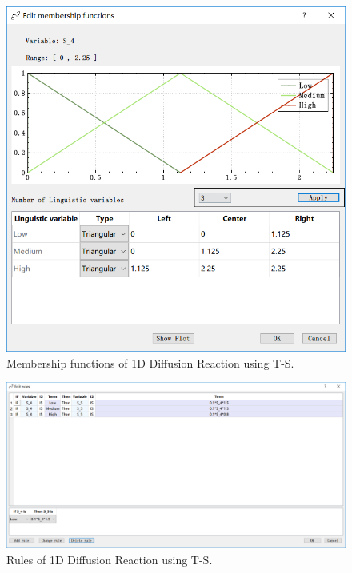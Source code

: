 \documentclass[journal,a4paper,onecolumn]{article}
\begin{document}
\begin{figure}[!hbt]
	\begin{center}
		\includegraphics[width=\columnwidth]{fig34}
		\caption{Membership functions of 1D Diffusion Reaction using T-S.}
		\label{fig:Membership functions of 1D Diffusion Reaction using T-S.}
	\end{center}
\end{figure}

\begin{figure}[!hbt]
	\begin{center}
		\includegraphics[width=\columnwidth]{fig35}
		\caption{Rules of 1D Diffusion Reaction using T-S.}
		\label{fig:Rules of 1D Diffusion Reaction using T-S.}
	\end{center}
\end{figure}
\end{document}
